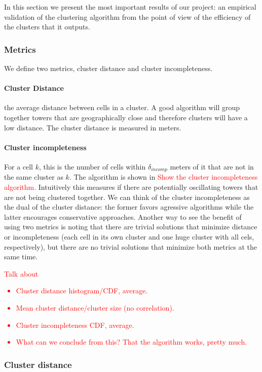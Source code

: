 \documentclass[letterpaper, 11pt, conference]{ieeeconf}
\newcommand{\xxx}[1]{\textcolor{red}{#1}}
\begin{document}
In this section we present the most important results of our project: an empirical validation of the clustering algorithm from the point of view of the efficiency of the clusters that it outputs.

\subsubsection{Metrics}

We define two metrics, cluster distance and cluster incompleteness.

\paragraph{Cluster Distance} the average distance between cells in a cluster. A good algorithm will group together towers that are geographically close and therefore clusters will have a low distance. The cluster distance is measured in meters.

\paragraph{Cluster incompleteness} For a cell $k$, this is the number of cells within $\delta_{incomp}$ meters of it that are not in the same cluster as $k$. The algorithm is shown in \xxx{Show the cluster incompleteness algorithm.} Intuitively this measures if there are potentially oscillating towers that are not being clustered together. We can think of the cluster incompleteness as the dual of the cluster distance: the former favors agressive algorithms while the latter encourages conservative approaches. Another way to see the benefit of using two metrics is noting that there are trivial solutions that minimize distance or incompleteness (each cell in its own cluster and one huge cluster with all cels, respectively), but there are no trivial solutions that minimize both metrics at the same time.

\xxx{Talk about\begin{itemize}
	\item Cluster distance histogram/CDF, average.
	\item Mean cluster distance/cluster size (no correlation).
	\item Cluster incompleteness CDF, average.
	\item What can we conclude from this? That the algorithm works, pretty much.
\end{itemize}}

\subsubsection{Cluster distance}
\end{document}
